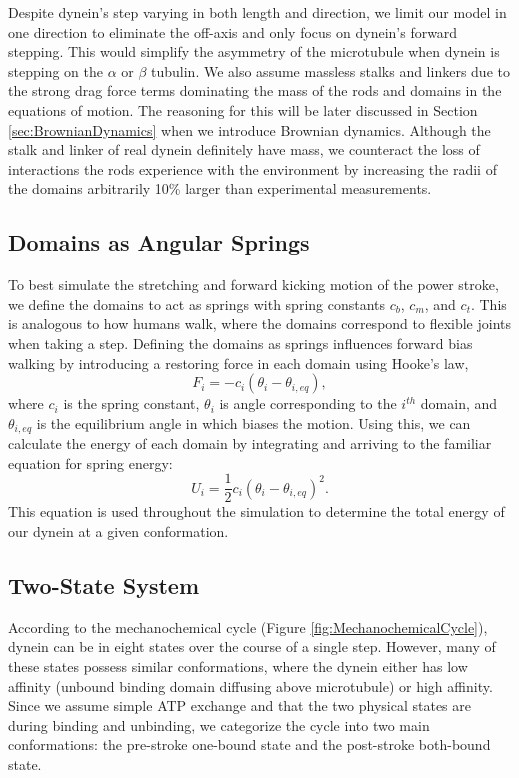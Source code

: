 Despite dynein's step varying in both length and direction, we limit our model in one direction to eliminate the off-axis and only focus on dynein's forward stepping. This would simplify the asymmetry of the microtubule when dynein is stepping on the $\alpha$ or $\beta$ tubulin. We also assume massless stalks and linkers due to the strong drag force terms dominating the mass of the rods and domains in the equations of motion. The reasoning for this will be later discussed in Section \ref{sec:BrownianDynamics} when we introduce Brownian dynamics. Although the stalk and linker of real dynein definitely have mass, we counteract the loss of interactions the rods experience with the environment by increasing the radii of the domains arbitrarily 10\% larger than experimental measurements.

\subsection{Domains as Angular Springs}
To best simulate the stretching and forward kicking motion of the power stroke, we define the domains to act as springs with spring constants $c_b$, $c_m$, and $c_t$. This is analogous to how humans walk, where the domains correspond to flexible joints when taking a step. Defining the domains as springs influences forward bias walking by introducing a restoring force in each domain using Hooke's law, 
\begin{equation}
    F_i=-c_i(\theta_i-\theta_{i,eq}),
\end{equation}
where $c_i$ is the spring constant, $\theta_i$ is angle corresponding to the $i^{th}$ domain, and $\theta_{i,eq}$ is the equilibrium angle in which biases the motion. Using this, we can calculate the energy of each domain by integrating and arriving to the familiar equation for spring energy:
\begin{equation} \label{eqn:energy}
    U_i=\frac{1}{2}c_i(\theta_i-\theta_{i,eq})^2.
\end{equation}
This equation is used throughout the simulation to determine the total energy of our dynein at a given conformation. 


\subsection{Two-State System}
According to the mechanochemical cycle (Figure \ref{fig:MechanochemicalCycle}), dynein can be in eight states over the course of a single step. However, many of these states possess similar conformations, where the dynein either has low affinity (unbound binding domain diffusing above microtubule) or high affinity. Since we assume simple ATP exchange and that the two physical states are during binding and unbinding, we categorize the cycle into two main conformations: the pre-stroke one-bound state and the post-stroke both-bound state.

